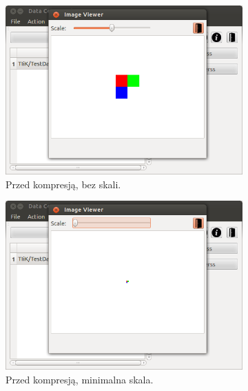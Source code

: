 \documentclass[12pt,a4paper,notitlepage]{report}
\begin{document}
\begin{figure}[H]
	\centering
	\caption{Okno umożliwiające przesłuchanie podgląd plików graficznych.}
	\begin{subfigure}{0.45\textwidth}
		\centering
		\includegraphics[scale=.4]{imageviewer_nor}
		\caption{Przed kompresją, bez skali.}
	\end{subfigure}\hfill
	\begin{subfigure}{0.45\textwidth}
		\centering
		\includegraphics[scale=.4]{imageviewer_min}
		\caption{Przed kompresją, minimalna skala.}
	\end{subfigure}\\[.5cm]
	\begin{subfigure}{0.45\textwidth}
		\centering

\end{subfigure}
\end{figure}
\end{document}
